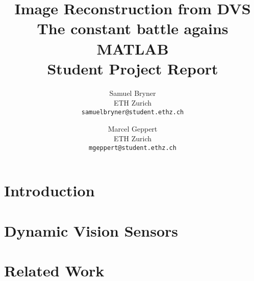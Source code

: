 \documentclass[10pt,twocolumn,letterpaper]{article}
\begin{document}

\title{Image Reconstruction from DVS\\ The constant battle agains MATLAB\\ Student Project Report}

\author{Samuel Bryner\\
ETH Zurich\\
{\tt\small samuelbryner@student.ethz.ch}
\and
Marcel Geppert\\
ETH Zurich\\
{\tt\small mgeppert@student.ethz.ch}
}

\maketitle


\begin{abstract}



\end{abstract}

\section{Introduction}
\label{sec:introduction}


\section{Dynamic Vision Sensors}
\label{sec:dvs}


\section{Related Work}
\label{sec:related_work}

\end{document}

